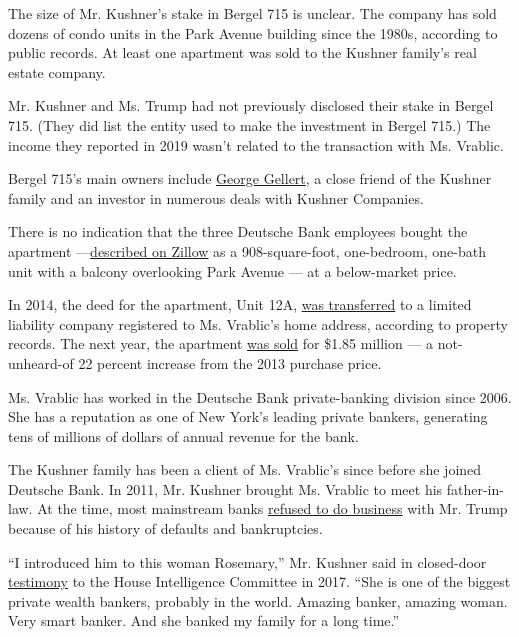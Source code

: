The size of Mr. Kushner's stake in Bergel 715 is unclear. The company
has sold dozens of condo units in the Park Avenue building since the
1980s, according to public records. At least one apartment was sold to
the Kushner family's real estate company.

Mr. Kushner and Ms. Trump had not previously disclosed their stake in
Bergel 715. (They did list the entity used to make the investment in
Bergel 715.) The income they reported in 2019 wasn't related to the
transaction with Ms. Vrablic.

Bergel 715's main owners include
\href{http://gellertglobalgroup.com/holdings.php?id=waltersamuels}{George
Gellert}, a close friend of the Kushner family and an investor in
numerous deals with Kushner Companies.

There is no indication that the three Deutsche Bank employees bought the
apartment
---\href{https://www.zillow.com/homedetails/715-Park-Ave-APT-12A-New-York-NY-10021/31535036_zpid/}{described
on Zillow} as a 908-square-foot, one-bedroom, one-bath unit with a
balcony overlooking Park Avenue --- at a below-market price.

In 2014, the deed for the apartment, Unit 12A,
\href{https://a836-acris.nyc.gov/DS/DocumentSearch/DocumentDetail?doc_id=2013122700639001}{was
transferred} to a limited liability company registered to Ms. Vrablic's
home address, according to property records. The next year, the
apartment
\href{https://a836-acris.nyc.gov/DS/DocumentSearch/DocumentDetail?doc_id=2015111100189001}{was
sold} for \$1.85 million --- a not-unheard-of 22 percent increase from
the 2013 purchase price.

Ms. Vrablic has worked in the Deutsche Bank private-banking division
since 2006. She has a reputation as one of New York's leading private
bankers, generating tens of millions of dollars of annual revenue for
the bank.

The Kushner family has been a client of Ms. Vrablic's since before she
joined Deutsche Bank. In 2011, Mr. Kushner brought Ms. Vrablic to meet
his father-in-law. At the time, most mainstream banks
\href{https://www.nytimes3xbfgragh.onion/2019/03/18/business/trump-deutsche-bank.html}{refused
to do business} with Mr. Trump because of his history of defaults and
bankruptcies.

``I introduced him to this woman Rosemary,'' Mr. Kushner said in
closed-door
\href{https://intelligence.house.gov/uploadedfiles/jk25.pdf}{testimony}
to the House Intelligence Committee in 2017. ``She is one of the biggest
private wealth bankers, probably in the world. Amazing banker, amazing
woman. Very smart banker. And she banked my family for a long time.''

